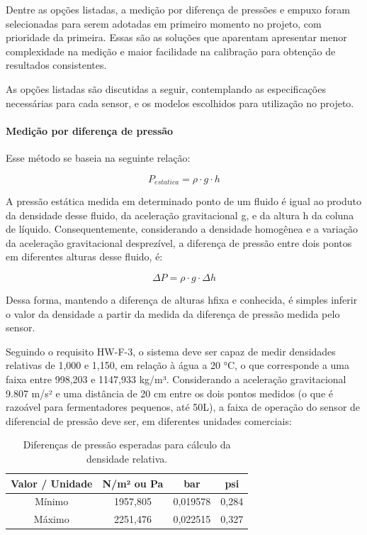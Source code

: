 Dentre as opções listadas, a medição por diferença de pressões e empuxo foram selecionadas para serem adotadas em primeiro momento no projeto, com prioridade da primeira. Essas são as soluções que aparentam apresentar menor complexidade na medição e maior facilidade na calibração para obtenção de resultados consistentes.


As opções listadas são discutidas a seguir, contemplando as especificações necessárias para cada sensor, e os modelos escolhidos para utilização no projeto.

\paragraph{Medição por diferença de pressão} 


Esse método se baseia na seguinte relação:

\begin{equation}
P_{estatica} = \rho \cdot g \cdot h
\end{equation}

A pressão estática medida em determinado ponto de um fluido é igual ao produto da densidade  desse fluido, da aceleração gravitacional g, e da altura h da coluna de líquido. Consequentemente, considerando a densidade homogênea e a variação da aceleração gravitacional desprezível, a diferença de pressão entre dois pontos em diferentes alturas desse fluido, é:

\begin{equation}
\Delta P = \rho \cdot g \cdot \Delta h
\end{equation}

Dessa forma, mantendo a diferença de alturas hfixa e conhecida, é simples inferir o valor da densidade a partir da medida da diferença de pressão medida pelo sensor.


Seguindo o requisito HW-F-3, o sistema deve ser capaz de medir densidades relativas de 1,000 e 1,150, em relação à água a 20 °C, o que corresponde a uma faixa entre 998,203 e 1147,933 kg/m³. Considerando a aceleração gravitacional 9.807 m/s² e uma distância de 20 cm entre os dois pontos medidos (o que é razoável para fermentadores pequenos, até 50L), a faixa de operação do sensor de diferencial de pressão deve ser, em diferentes unidades comerciais:

\begin{table}
    \begin{center}
        \begin{tabular}{ |c|c|c|c| } 
            \hline
            Valor / Unidade & N/m² ou Pa & bar & psi \\
            \hline
            Mínimo & 1957,805 & 0,019578 & 0,284 \\ 
            \hline
            Máximo & 2251,476 & 0,022515 & 0,327 \\ 
            \hline
        \end{tabular}
        \caption{\label{tab:densidades}Diferenças de pressão esperadas para cálculo da densidade relativa.}
    \end{center}
\end{table}

